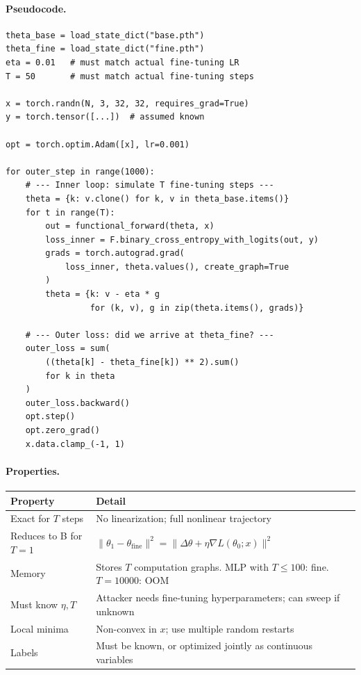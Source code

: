 \documentclass[11pt,a4paper]{article}
\begin{document}
\paragraph{Pseudocode.}

\begin{lstlisting}
theta_base = load_state_dict("base.pth")
theta_fine = load_state_dict("fine.pth")
eta = 0.01   # must match actual fine-tuning LR
T = 50       # must match actual fine-tuning steps

x = torch.randn(N, 3, 32, 32, requires_grad=True)
y = torch.tensor([...])  # assumed known

opt = torch.optim.Adam([x], lr=0.001)

for outer_step in range(1000):
    # --- Inner loop: simulate T fine-tuning steps ---
    theta = {k: v.clone() for k, v in theta_base.items()}
    for t in range(T):
        out = functional_forward(theta, x)
        loss_inner = F.binary_cross_entropy_with_logits(out, y)
        grads = torch.autograd.grad(
            loss_inner, theta.values(), create_graph=True
        )
        theta = {k: v - eta * g
                 for (k, v), g in zip(theta.items(), grads)}

    # --- Outer loss: did we arrive at theta_fine? ---
    outer_loss = sum(
        ((theta[k] - theta_fine[k]) ** 2).sum()
        for k in theta
    )
    outer_loss.backward()
    opt.step()
    opt.zero_grad()
    x.data.clamp_(-1, 1)
\end{lstlisting}

\paragraph{Properties.}

\begin{center}
\begin{tabular}{ll}
\toprule
\textbf{Property} & \textbf{Detail} \\
\midrule
Exact for $T$ steps & No linearization; full nonlinear trajectory \\
Reduces to B for $T{=}1$ & $\|\theta_1 - \theta_{\mathrm{fine}}\|^2 = \|\Delta\theta + \eta\nabla L(\theta_0; x)\|^2$ \\
Memory & Stores $T$ computation graphs. MLP with $T{\leq}100$: fine. $T{=}10000$: OOM \\
Must know $\eta, T$ & Attacker needs fine-tuning hyperparameters; can sweep if unknown \\
Local minima & Non-convex in $x$; use multiple random restarts \\
Labels & Must be known, or optimized jointly as continuous variables \\
\bottomrule
\end{tabular}
\end{center}
\end{document}
